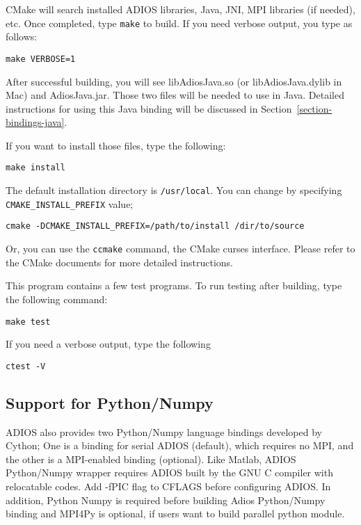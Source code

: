 CMake will search installed ADIOS libraries, Java, JNI, MPI libraries (if
needed), etc. Once completed, type \verb+make+ to build. If you need verbose output, you type as follows:
\begin{lstlisting}
make VERBOSE=1
\end{lstlisting}

After successful building, you will see libAdiosJava.so (or
libAdiosJava.dylib in Mac) and AdiosJava.jar. Those two files will be needed to use in Java. Detailed instructions for using this Java binding will be discussed in Section~\ref{section-bindings-java}.

If you want to install those files, type the following:
\begin{lstlisting}
make install
\end{lstlisting}

The default installation directory is \verb+/usr/local+. You can change by
specifying \verb+CMAKE_INSTALL_PREFIX+ value;
\begin{lstlisting}
cmake -DCMAKE_INSTALL_PREFIX=/path/to/install /dir/to/source
\end{lstlisting}

Or, you can use the \verb+ccmake+ command, the CMake curses interface. Please refer to the CMake documents for more detailed instructions.

This program contains a few test programs. To run testing after building,
type the following command:
\begin{lstlisting}
make test
\end{lstlisting}

If you need a verbose output, type the following
\begin{lstlisting}
ctest -V
\end{lstlisting}

\subsection{Support for Python/Numpy}
\label{section-install-numpy}

ADIOS also provides two Python/Numpy language bindings developed by Cython; One is a binding for serial ADIOS (default), which requires no MPI, and the other is a MPI-enabled binding (optional). Like Matlab, ADIOS Python/Numpy wrapper requires ADIOS built by the GNU C compiler with relocatable codes. Add -fPIC flag to CFLAGS before configuring ADIOS. In addition, Python Numpy is required before building Adios Python/Numpy binding and MPI4Py is optional, if users want to build parallel python module.

